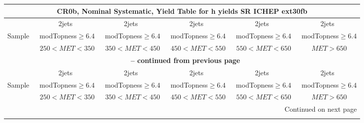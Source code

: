 \documentclass{article}
\begin{document}
\begin{longtable}{|l|c|c|c|c|c|} 
 
\multicolumn{6}{c}{ CR0b, Nominal Systematic, Yield Table for h yields SR ICHEP ext30fb }\\* \hline 
  & 2jets  & 2jets  & 2jets  & 2jets  & 2jets \\* 
Sample  & ~modTopness$\ge6.4$  & ~modTopness$\ge6.4$  & ~modTopness$\ge6.4$  & ~modTopness$\ge6.4$  & ~modTopness$\ge6.4$ \\* 
  & ~$250<MET<350$  & ~$350<MET<450$  & ~$450<MET<550$  & ~$550<MET<650$  & ~$MET>650$ \\* 
\hline \hline 
\endfirsthead 
 
\multicolumn{6}{c}{{\bfseries \tablename\ \thetable{} -- continued from previous page}}\\* \hline 
  & 2jets  & 2jets  & 2jets  & 2jets  & 2jets \\* 
Sample  & ~modTopness$\ge6.4$  & ~modTopness$\ge6.4$  & ~modTopness$\ge6.4$  & ~modTopness$\ge6.4$  & ~modTopness$\ge6.4$ \\* 
  & ~$250<MET<350$  & ~$350<MET<450$  & ~$450<MET<550$  & ~$550<MET<650$  & ~$MET>650$ \\* 
\hline \hline 
\endhead 
 
\multicolumn{6}{|r|}{{Continued on next page}}\\* \hline 
\endfoot 
 
 
\endlastfoot 
 

\end{longtable}
\end{document}
